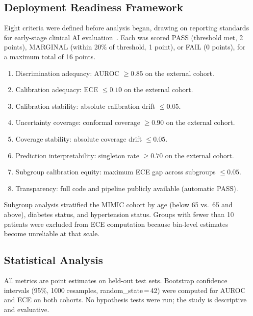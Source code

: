 \subsection{Deployment Readiness Framework}

Eight criteria were defined before analysis began, drawing on reporting standards for early-stage clinical AI evaluation~\cite{Vasey2022,Collins2024TRIPOD}. Each was scored PASS (threshold met, 2 points), MARGINAL (within 20\% of threshold, 1 point), or FAIL (0 points), for a maximum total of 16 points.

\begin{enumerate}
  \item Discrimination adequacy: AUROC $\geq 0.85$ on the external cohort.
  \item Calibration adequacy: ECE $\leq 0.10$ on the external cohort.
  \item Calibration stability: absolute calibration drift $\leq 0.05$.
  \item Uncertainty coverage: conformal coverage $\geq 0.90$ on the external cohort.
  \item Coverage stability: absolute coverage drift $\leq 0.05$.
  \item Prediction interpretability: singleton rate $\geq 0.70$ on the external cohort.
  \item Subgroup calibration equity: maximum ECE gap across subgroups $\leq 0.05$.
  \item Transparency: full code and pipeline publicly available (automatic PASS).
\end{enumerate}

Subgroup analysis stratified the MIMIC cohort by age (below 65 vs.\ 65 and above), diabetes status, and hypertension status. Groups with fewer than 10 patients were excluded from ECE computation because bin-level estimates become unreliable at that scale.

\subsection{Statistical Analysis}

All metrics are point estimates on held-out test sets. Bootstrap confidence intervals (95\%, 1000 resamples, random\_state\,=\,42) were computed for AUROC and ECE on both cohorts. No hypothesis tests were run; the study is descriptive and evaluative.
